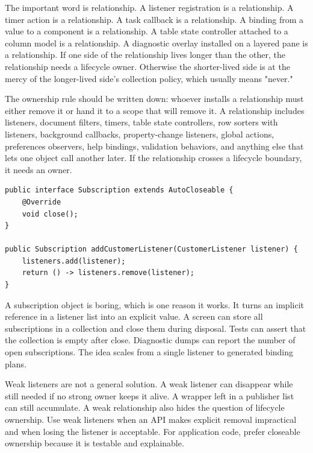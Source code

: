 The important word is relationship. A listener registration is a relationship. A timer action is a relationship. A task callback is a relationship. A binding from a value to a component is a relationship. A table state controller attached to a column model is a relationship. A diagnostic overlay installed on a layered pane is a relationship. If one side of the relationship lives longer than the other, the relationship needs a lifecycle owner. Otherwise the shorter-lived side is at the mercy of the longer-lived side's collection policy, which usually means "never."

The ownership rule should be written down: whoever installs a relationship must either remove it or hand it to a scope that will remove it. A relationship includes listeners, document filters, timers, table state controllers, row sorters with listeners, background callbacks, property-change listeners, global actions, preferences observers, help bindings, validation behaviors, and anything else that lets one object call another later. If the relationship crosses a lifecycle boundary, it needs an owner.

\begin{lstlisting}[caption={A closeable subscription pattern for plain Swing code.}]
public interface Subscription extends AutoCloseable {
    @Override
    void close();
}

public Subscription addCustomerListener(CustomerListener listener) {
    listeners.add(listener);
    return () -> listeners.remove(listener);
}
\end{lstlisting}

A subscription object is boring, which is one reason it works. It turns an implicit reference in a listener list into an explicit value. A screen can store all subscriptions in a collection and close them during disposal. Tests can assert that the collection is empty after close. Diagnostic dumps can report the number of open subscriptions. The idea scales from a single listener to generated binding plans.

Weak listeners are not a general solution. A weak listener can disappear while still needed if no strong owner keeps it alive. A wrapper left in a publisher list can still accumulate. A weak relationship also hides the question of lifecycle ownership. Use weak listeners when an API makes explicit removal impractical and when losing the listener is acceptable. For application code, prefer closeable ownership because it is testable and explainable.

